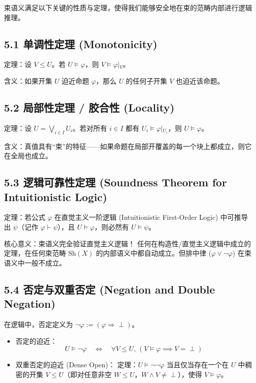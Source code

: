 \documentclass[12pt,a4paper]{article}
\begin{document}
束语义满足以下关键的性质与定理，使得我们能够安全地在束的范畴内部进行逻辑推理。

\subsection{5.1 单调性定理 (Monotonicity)}

定理：设 $V \le U$。若 $U \models \varphi$，则 $V \models \varphi\vert{}_V$。

含义：如果开集 $U$ 迫近命题 $\varphi$，那么 $U$ 的任何子开集 $V$ 也迫近该命题。

\subsection{5.2 局部性定理 / 胶合性 (Locality)}

定理：设 $U = \bigvee_{i \in I} U_i$。若对所有 $i \in I$ 都有 $U_i \models \varphi\vert{}_{U_i}$，则 $U \models \varphi$。

含义：真值具有“束”的特征——如果命题在局部开覆盖的每一个块上都成立，则它在全局也成立。

\subsection{5.3 逻辑可靠性定理 (Soundness Theorem for Intuitionistic Logic)}

定理：若公式 $\varphi$ 在直觉主义一阶逻辑 (Intuitionistic First-Order Logic) 中可推导出 $\psi$（记作 $\varphi \vdash \psi$），且 $U \models \varphi$，则必然有 $U \models \psi$。

核心意义：束语义完全验证直觉主义逻辑！ 任何在构造性/直觉主义逻辑中成立的定理，在任何束范畴 $\text{Sh}(X)$ 的内部语义中都自动成立。但排中律 ($\varphi \vee \neg\varphi$) 在束语义中一般不成立。

\subsection{5.4 否定与双重否定 (Negation and Double Negation)}

在逻辑中，否定定义为 $\neg \varphi := (\varphi \Rightarrow \perp)$。

\begin{itemize}
  \item 否定的迫近：
  \[
  U \models \neg \varphi \quad \iff \quad \forall V \le U, \, (V \models \varphi \implies V = \perp)
  \]
  \item 双重否定的迫近 (Dense Open)：
  定理：$U \models \neg\neg \varphi$ 当且仅当存在一个在 $U$ 中稠密的开集 $V \le U$（即对任意非空 $W \le U$，$W \wedge V \ne \perp$），使得 $V \models \varphi$。
\end{itemize}
\end{document}
